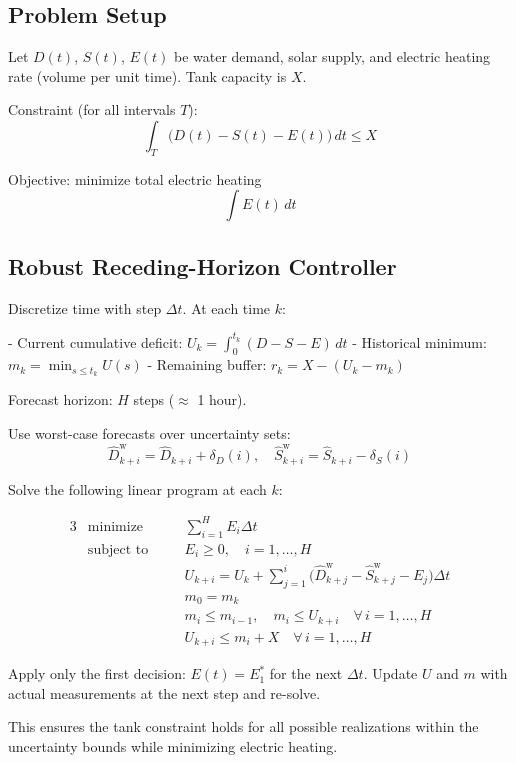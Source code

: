 \documentclass{article}
\begin{document}
\subsection{Problem Setup}

Let $D(t)$, $S(t)$, $E(t)$ be water demand, solar supply, and electric heating rate (volume per unit time).  
Tank capacity is $X$.

Constraint (for all intervals $T$):
\[
\int_T \bigl( D(t) - S(t) - E(t) \bigr)\, dt \leq X
\]

Objective: minimize total electric heating
\[
\int E(t)\, dt
\]

\subsection{Robust Receding-Horizon Controller}

Discretize time with step $\Delta t$. At each time $k$:

- Current cumulative deficit: $U_k = \int_0^{t_k} (D - S - E)\, dt$
- Historical minimum: $m_k = \min_{s \leq t_k} U(s)$
- Remaining buffer: $r_k = X - (U_k - m_k)$

Forecast horizon: $H$ steps ($\approx$ 1 hour).

Use worst-case forecasts over uncertainty sets:
\[
\hat{D}_{k+i}^\text{w} = \hat{D}_{k+i} + \delta_D(i), \quad
\hat{S}_{k+i}^\text{w} = \hat{S}_{k+i} - \delta_S(i)
\]

Solve the following linear program at each $k$:

\begin{alignat*}{3}
&\text{minimize}   &\quad& \sum_{i=1}^H E_i \Delta t \\
&\text{subject to} &\quad& E_i \geq 0, \quad i=1,\dots,H \\
&                  && U_{k+i} = U_k + \sum_{j=1}^i \bigl( \hat{D}_{k+j}^\text{w} - \hat{S}_{k+j}^\text{w} - E_j \bigr) \Delta t \\
&                  && m_0 = m_k \\
&                  && m_i \leq m_{i-1},\quad m_i \leq U_{k+i} \quad \forall\, i=1,\dots,H \\
&                  && U_{k+i} \leq m_i + X \quad \forall\, i=1,\dots,H
\end{alignat*}

Apply only the first decision: $E(t) = E_1^*$ for the next $\Delta t$.  
Update $U$ and $m$ with actual measurements at the next step and re-solve.

This ensures the tank constraint holds for all possible realizations within the uncertainty bounds while minimizing electric heating.
\end{document}
